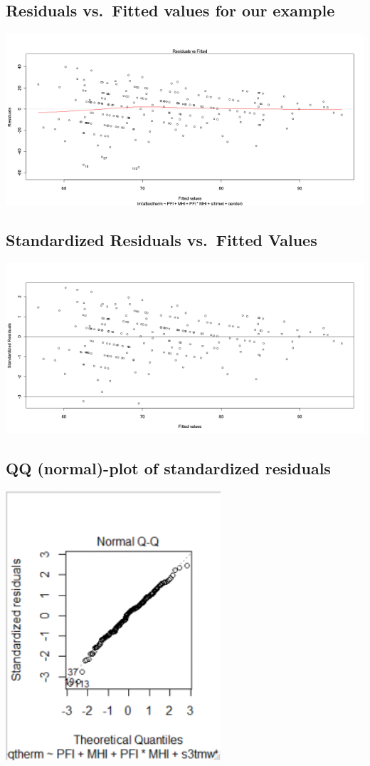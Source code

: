 \documentclass[
]{book}
\begin{document}
\hypertarget{residuals-vs.-fitted-values-for-our-example}{%
\subsection{Residuals vs.~Fitted values for our example}\label{residuals-vs.-fitted-values-for-our-example}}

\includegraphics[width=1\linewidth]{./12_66}

\hypertarget{standardized-residuals-vs.-fitted-values}{%
\subsection{Standardized Residuals vs.~Fitted Values}\label{standardized-residuals-vs.-fitted-values}}

\includegraphics[width=1\linewidth]{./12_67}

\hypertarget{qq-normal-plot-of-standardized-residuals}{%
\subsection{QQ (normal)-plot of standardized residuals}\label{qq-normal-plot-of-standardized-residuals}}

\includegraphics[width=0.3\linewidth]{./12_68}
\end{document}
